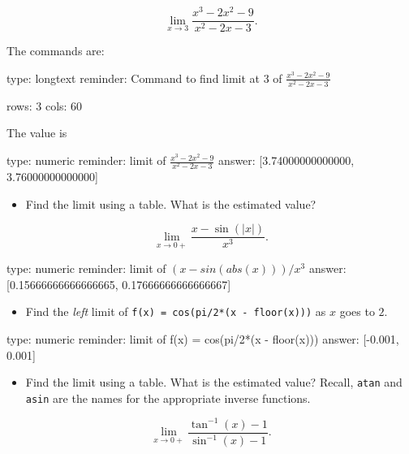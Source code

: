 \documentclass[12pt]{article}
\begin{document}
\[
\lim_{x \rightarrow 3} \frac{x^3 - 2x^2 -9}{x^2 - 2x -3}.
\]

The commands are:

\begin{answer}
type: longtext
reminder: Command to find limit at 3 of \( \frac{x^3 - 2x^2 -9}{x^2 - 2x -3} \)

rows: 3
cols: 60
\end{answer}

The value is

\begin{answer}
    type: numeric
    reminder: limit of \( \frac{x^3 - 2x^2 -9}{x^2 - 2x -3} \)
    answer: [3.74000000000000, 3.76000000000000]

\end{answer}

\begin{itemize}
\itemsep1pt\parskip0pt
\item
  Find the limit using a table. What is the estimated value?
\end{itemize}

\[
\lim_{x \rightarrow 0+} \frac{x - \sin(\vert x\vert )}{x^3}.
\]

\begin{answer}
    type: numeric
    reminder: limit of \( (x - sin(abs(x)))/x^3 \)
    answer: [0.15666666666666665, 0.17666666666666667]

\end{answer}

\begin{itemize}
\itemsep1pt\parskip0pt
\item
  Find the \emph{left} limit of \texttt{f(x) = cos(pi/2*(x - floor(x)))}
  as $x$ goes to $2$.
\end{itemize}

\begin{answer}
    type: numeric
    reminder: limit of f(x) = cos(pi/2*(x - floor(x)))
    answer: [-0.001, 0.001]

\end{answer}

\begin{itemize}
\itemsep1pt\parskip0pt
\item
  Find the limit using a table. What is the estimated value? Recall,
  \texttt{atan} and \texttt{asin} are the names for the appropriate
  inverse functions.
\end{itemize}

\[
\lim_{x \rightarrow 0+} \frac{\tan^{-1}(x) - 1}{\sin^{-1}(x) - 1}.
\]
\end{document}
